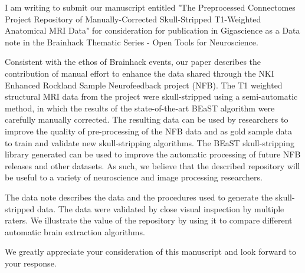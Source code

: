 \documentclass{article}
\begin{document}
\sffamily

I am writing to submit our manuscript entitled "The Preprocessed Connectomes Project Repository of Manually-Corrected Skull-Stripped T1-Weighted Anatomical MRI Data" for consideration for publication in Gigascience as a Data note in the Brainhack Thematic Series - Open Tools for Neuroscience.

Consistent with the ethos of Brainhack events, our paper describes the contribution of manual effort to enhance the data shared through the NKI Enhanced Rockland Sample Neurofeedback project (NFB). The T1 weighted structural MRI data from the project were skull-stripped using a semi-automatic method, in which the results of the state-of-the-art BEaST algorithm were carefully manually corrected. The resulting data can be used by researchers to improve the quality of pre-processing of the NFB data and as gold sample data to train and validate new skull-stripping algorithms. The BEaST skull-stripping library generated can be used to improve the automatic processing of future NFB releases and other datasets. As such, we believe that the described repository will be useful to a variety of neuroscience and image processing researchers.

The data note describes the data and the procedures used to generate the skull-stripped data. The data were validated by close visual inspection by multiple raters. We illustrate the value of the repository by using it to compare different automatic brain extraction algorithms. 

We greatly appreciate your consideration of this manuscript and look forward to your response.
\end{document}
